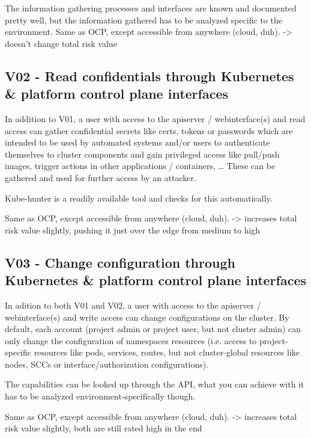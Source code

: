 The information gathering processes and interfaces are known and documented pretty well, but the information gathered has to be analyzed specific to the environment.
Same as OCP, except accessible from anywhere (cloud, duh).
-> doesn’t change total risk value

\subsection{V02 - Read confidentials through Kubernetes \& platform control plane interfaces}
In addition to V01, a user with access to the apiserver / webinterface(s) and read access can gather confidential secrets like certs, tokens or passwords which are intended to be used by automated systems and/or users to authenticate themselves to cluster components and gain privileged access like pull/push images, trigger actions in other applications / containers, …
These can be gathered and used for further access by an attacker.

Kube-hunter is a readily available tool and checks for this automatically.

Same as OCP, except accessible from anywhere (cloud, duh).
-> increases total risk value slightly, pushing it just over the edge from medium to high

\subsection{V03 - Change configuration through Kubernetes \& platform control plane interfaces}
In adition to both V01 and V02, a user with access to the apiserver / webinterface(s) and write access can change configurations on the cluster. By default, each account (project admin or project user, but not cluster admin) can only change the configuration of namespaces resources (i.e. access to project-specific resources like pods, services, routes, but not cluster-global resources like nodes, SCCs or interface/authorization configurations). 

The capabilities can be looked up through the API, what you can achieve with it has to be analyzed environment-specifically though.

Same as OCP, except accessible from anywhere (cloud, duh).
-> increases total risk value slightly, both are still rated high in the end



